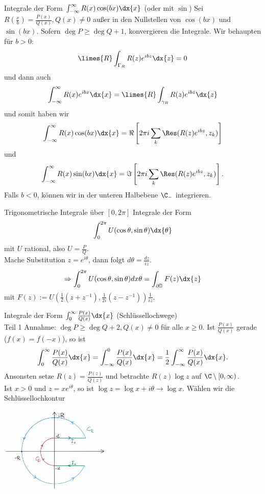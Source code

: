 \begin{karte}{Integrale der Form \(\int_{-\infty}^\infty R(x) \cos(bx) \dx{x}\) (oder mit \(\sin\))}
    Sei \(R(\frac{x}{b}) = \frac{P(x)}{Q(x)}, Q(x) \neq 0\) außer in den Nullstellen von \(\cos(bx)\)
    und \(\sin(bx)\). Sofern \(\deg P \geq \deg Q + 1\), konvergieren die Integrale.
    Wir behaupten für \(b>0\): 
    \[ \limes{R} \int_{\Gamma_R} R(z) e^{ibz} \dx{z} = 0 \]
    und dann auch 
    \[ \int_{-\infty}^\infty R(x) e^{ibx} \dx{x} = \limes{R} \int_{\gamma_R} R(z) e^{ibz} \dx{z} \]
    und somit haben wir 
    \[ \int_{-\infty}^\infty R(x) \cos(bx)\dx{x} = \Re \left[ 2\pi i \sum_k \Res(R(z) e^{ibz}, z_k) \right] \]
    und 
    \[ \int_{-\infty}^\infty R(x) \sin(bx)\dx{x} = \Im \left[ 2\pi i \sum_k \Res(R(z) e^{ibz}, z_k) \right]. \]
    Falls \(b<0\), können wir in der unteren Halbebene \(\C_-\) integrieren.
\end{karte}

\begin{karte}{Trigonometrische Integrale über \([0,2\pi]\)}
    Integrale der Form 
    \[ \int_0^{2\pi} U(\cos \theta, \sin \theta) \dx{\theta} \]
    mit \(U\) rational, also \(U = \frac{P}{Q}\).\\
    Mache Substitution \(z = e^{i\theta}\), dann folgt 
    \(d\theta = \frac{dz}{iz}\).
    \[ \Rightarrow \int_0^{2\pi} U(\cos \theta, \sin \theta) dx{\theta} = \int_{\partial \mathbb{D}} F(z) \dx{z} \]
    mit \(F(z) := U(\frac{1}{2} (z + z^{-1}), \frac{1}{2i} (z - z^{-1}) ) \frac{1}{iz}\).
\end{karte}

\begin{karte}{Integrale der Form \( \int_0^\infty \frac{P(x)}{Q(x)} \dx{x} \) (Schlüssellochwege) \\Teil 1}
    Annahme: \(\deg P \geq \deg Q + 2, Q(x) \neq 0\) für alle \(x\geq 0\). 
    Ist \(\frac{P(x)}{Q(x)}\) gerade (\(f(x) = f(-x)\)), so ist 
    \[ \int_0^\infty \frac{P(x)}{Q(x)} \dx{x} = \int_{-\infty}^0 \frac{P(x)}{Q(x)} \dx{x} = 
    \frac{1}{2} \int_{-\infty}^\infty \frac{P(x)}{Q(x)}\dx{x}. \]
    Ansonsten setze \(R(z) = \frac{P(z)}{Q(z)}\) und betrachte \(R(z) \log z\) auf 
    \(\C \setminus [0,\infty)\).\\
    Ist \(x > 0\) und \(z = xe^{i\theta}\), so ist \(\log z = \log x + i\theta \rightarrow \log x\).
    Wählen wir die Schlüssellochkontur 
    \begin{center}
        \includegraphics[width=0.4\textwidth]{img/kurve-schluesselloch.png}
    \end{center}
\end{karte}

